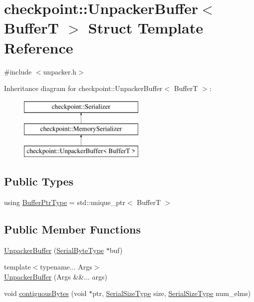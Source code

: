 \hypertarget{structcheckpoint_1_1_unpacker_buffer}{}\section{checkpoint\+:\+:Unpacker\+Buffer$<$ BufferT $>$ Struct Template Reference}
\label{structcheckpoint_1_1_unpacker_buffer}


{\ttfamily \#include $<$unpacker.\+h$>$}

Inheritance diagram for checkpoint\+:\+:Unpacker\+Buffer$<$ BufferT $>$\+:\begin{figure}[H]
\begin{center}
\leavevmode
\includegraphics[height=3.000000cm]{structcheckpoint_1_1_unpacker_buffer}
\end{center}
\end{figure}
\subsection*{Public Types}
\begin{DoxyCompactItemize}
\item 
using \hyperlink{structcheckpoint_1_1_unpacker_buffer_acdd2460fdb60fc584e04cb4069060613}{Buffer\+Ptr\+Type} = std\+::unique\+\_\+ptr$<$ BufferT $>$
\end{DoxyCompactItemize}
\subsection*{Public Member Functions}
\begin{DoxyCompactItemize}
\item 
\hyperlink{structcheckpoint_1_1_unpacker_buffer_a38d2f76f492c5dad5ab59747a6169e18}{Unpacker\+Buffer} (\hyperlink{namespacecheckpoint_ae57f01cdc0b81776c23b6c7c934c58f5}{Serial\+Byte\+Type} $\ast$buf)
\item 
{\footnotesize template$<$typename... Args$>$ }\\\hyperlink{structcheckpoint_1_1_unpacker_buffer_a29ae9066bbc8f43a660d1e0b0163dd44}{Unpacker\+Buffer} (Args \&\&... args)
\item 
void \hyperlink{structcheckpoint_1_1_unpacker_buffer_af771af2cb7b14b35f13a1f4605a73148}{contiguous\+Bytes} (void $\ast$ptr, \hyperlink{namespacecheckpoint_a083f6674da3f94c2901b18c6d238217c}{Serial\+Size\+Type} size, \hyperlink{namespacecheckpoint_a083f6674da3f94c2901b18c6d238217c}{Serial\+Size\+Type} num\+\_\+elms)
\end{DoxyCompactItemize}
